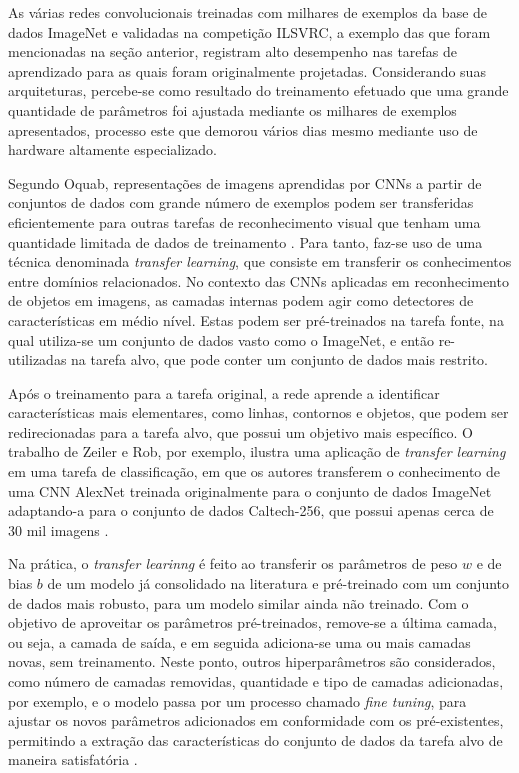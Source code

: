 As várias redes convolucionais treinadas com milhares de exemplos da base de dados ImageNet e validadas na competição ILSVRC, a exemplo das que foram mencionadas na seção anterior, registram alto desempenho nas tarefas de aprendizado para as quais foram originalmente projetadas. Considerando suas arquiteturas, percebe-se como resultado do treinamento efetuado que uma grande quantidade de parâmetros foi ajustada mediante os milhares de exemplos apresentados, processo este que demorou vários dias mesmo mediante uso de hardware altamente especializado.

Segundo Oquab, representações de imagens aprendidas por CNNs a partir de conjuntos de dados com grande número de exemplos podem ser transferidas eficientemente para outras tarefas de reconhecimento visual que tenham uma quantidade limitada de dados de treinamento \cite{oquab2014learning}. Para tanto, faz-se uso de uma técnica denominada \emph{transfer learning}, que consiste em transferir os conhecimentos entre domínios relacionados. No contexto das CNNs aplicadas em reconhecimento de objetos em imagens, as camadas internas podem agir como detectores de características em médio nível. Estas podem ser pré-treinados na tarefa fonte, na qual utiliza-se um conjunto de dados vasto como o ImageNet, e então re-utilizadas na tarefa alvo, que pode conter um conjunto de dados mais restrito.

Após o treinamento para a tarefa original, a rede aprende a identificar características mais elementares, como linhas, contornos e objetos, que podem ser redirecionadas para a tarefa alvo, que possui um objetivo mais específico. O trabalho de Zeiler e Rob, por exemplo, ilustra uma aplicação de \emph{transfer learning} em uma tarefa de classificação, em que os autores transferem o conhecimento de uma CNN AlexNet treinada originalmente para o conjunto de dados ImageNet adaptando-a para o conjunto de dados Caltech-256, que possui apenas cerca de 30 mil imagens \cite{zeiler2014visualizing}.

Na prática, o \emph{transfer learinng} é feito ao transferir os parâmetros de peso $w$ e de bias $b$ de um modelo já consolidado na literatura e pré-treinado com um conjunto de dados mais robusto, para um modelo similar ainda não treinado. Com o objetivo de aproveitar os parâmetros pré-treinados, remove-se a última camada, ou seja, a camada de saída, e em seguida adiciona-se uma ou mais camadas novas, sem treinamento. Neste ponto, outros hiperparâmetros são considerados, como número de camadas removidas, quantidade e tipo de camadas adicionadas, por exemplo, e o modelo passa por um processo chamado \emph{fine tuning}, para ajustar os novos parâmetros adicionados em conformidade com os pré-existentes, permitindo a extração das características do conjunto de dados da tarefa alvo de maneira satisfatória \cite{oquab2014learning}.
